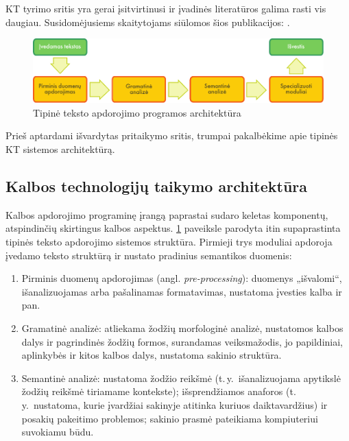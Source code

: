 \begin{multicols}{2}
KT tyrimo sritis yra gerai įsitvirtinusi ir įvadinės literatūros galima rasti vis daugiau. Susidomėjusiems skaitytojams siūlomos šios publikacijos:  \cite{carstensen-etal1, jurafsky-martin01, manning-schuetze1, lt-world1, lt-survey1}.

\begin{figure}[hb]
  \center
  \includegraphics[width=\textwidth]{../_media/lithuanian/text_processing_app_architecture}
  \caption{Tipinė teksto apdorojimo programos architektūra}
  \label{fig:textprocessingarch_de}
\end{figure}

Prieš aptardami išvardytas pritaikymo sritis, trumpai pakalbėkime apie tipinės KT sistemos architektūrą.  

\subsection{Kalbos technologijų taikymo architektūra}

Kalbos apdorojimo programinę įrangą paprastai sudaro keletas komponentų, atspindinčių skirtingus kalbos aspektus.  \ref{fig:textprocessingarch_de} paveiksle parodyta itin supaprastinta tipinės teksto apdorojimo sistemos struktūra. Pirmieji trys moduliai apdoroja įvedamo teksto struktūrą ir nustato pradinius semantikos duomenis:

\begin{enumerate}
\item Pirminis duomenų apdorojimas (angl. \textit{pre-processing}):  duomenys „išvalomi“, išanalizuojamas arba pašalinamas formatavimas, nustatoma įvesties kalba ir pan.
\item Gramatinė analizė: atliekama žodžių morfologinė analizė, nustatomos kalbos dalys ir pagrindinės žodžių formos, surandamas veiksmažodis, jo papildiniai, aplinkybės ir kitos kalbos dalys, nustatoma sakinio struktūra.
\item Semantinė analizė: nustatoma žodžio reikšmė (t.\,y.~išanalizuojama apytikslė žodžių reikšmė tiriamame kontekste); išsprendžiamos anaforos (t.\,y.~nustatoma, kurie įvardžiai sakinyje atitinka kuriuos daiktavardžius) ir posakių pakeitimo problemos; sakinio prasmė pateikiama kompiuteriui suvokiamu būdu.
\end{enumerate}


\end{multicols}
